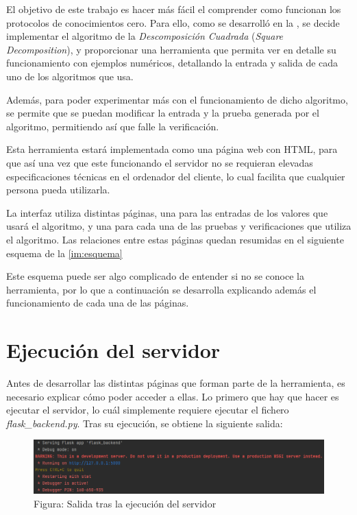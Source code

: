 El objetivo de este trabajo es hacer más fácil el comprender como funcionan los protocolos de conocimientos cero. Para ello, como se desarrolló en la , se decide implementar el algoritmo de la \emph{Descomposición Cuadrada} (\emph{Square Decomposition}), y proporcionar una herramienta que permita ver en detalle su funcionamiento con ejemplos numéricos, detallando la entrada y salida de cada uno de los algoritmos que usa.

Además, para poder experimentar más con el funcionamiento de dicho algoritmo, se permite que se puedan modificar la entrada y la prueba generada por el algoritmo, permitiendo así que falle la verificación.

Esta herramienta estará implementada como una página web con HTML, para que así una vez que este funcionando el servidor no se requieran elevadas especificaciones técnicas en el ordenador del cliente, lo cual facilita que cualquier persona pueda utilizarla.

La interfaz utiliza distintas páginas, una para las entradas de los valores que usará el algoritmo, y una para cada una de las pruebas y verificaciones que utiliza el algoritmo. Las relaciones entre estas páginas quedan resumidas en el siguiente esquema de la \autoref{im:esquema}

Este esquema puede ser algo complicado de entender si no se conoce la herramienta, por lo que a continuación se desarrolla explicando además el funcionamiento de cada una de las páginas.

\section*{Ejecución del servidor}

Antes de desarrollar las distintas páginas que forman parte de la herramienta, es necesario explicar cómo poder acceder a ellas. Lo primero que hay que hacer es ejecutar el servidor, lo cuál simplemente requiere ejecutar el fichero \emph{flask\_backend.py}. Tras su ejecución, se obtiene la siguiente salida:
\begin{figure}[H]
    \centering
    \includegraphics[width=\linewidth]{images/anexoA/server.png}
    \caption*{Figura: Salida tras la ejecución del servidor}
\end{figure}

